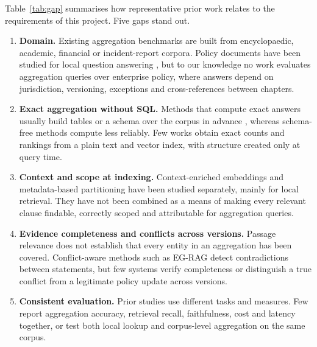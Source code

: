 \documentclass[11pt,letterpaper,oneside]{report}
\begin{document}
Table~\ref{tab:gap} summarises how representative prior work relates to the
requirements of this project. Five gaps stand out.

\begin{enumerate}
  \item \textbf{Domain.} Existing aggregation benchmarks are built from
  encyclopaedic, academic, financial or incident-report corpora. Policy
  documents have been studied for local question answering
  \citep{maharjan2026chunking}, but to our knowledge no work evaluates
  aggregation queries over enterprise policy, where answers depend on
  jurisdiction, versioning, exceptions and cross-references between chapters.
  \item \textbf{Exact aggregation without SQL.} Methods that compute exact
  answers usually build tables or a schema over the corpus in advance
  \citep{koshorek2025srag,lu2026corpusqa,patel2025lotus}, whereas schema-free
  methods compute less reliably. Few works obtain exact counts and rankings
  from a plain text and vector index, with structure created only at query
  time.
  \item \textbf{Context and scope at indexing.} Context-enriched embeddings
  \citep{gunther2024latechunking} and metadata-based partitioning
  \citep{maio2026olap,subedi2026dilution} have been studied separately,
  mainly for local retrieval. They have not been combined as a means of
  making every relevant clause findable, correctly scoped and attributable
  for aggregation queries.
  \item \textbf{Evidence completeness and conflicts across versions.}
  Passage relevance does not establish that every entity in an aggregation
  has been covered. Conflict-aware methods such as EG-RAG
  \citep{hong2026egrag} detect contradictions between statements, but few
  systems verify completeness or distinguish a true conflict from a
  legitimate policy update across versions.
  \item \textbf{Consistent evaluation.} Prior studies use different tasks
  and measures. Few report aggregation accuracy, retrieval recall,
  faithfulness, cost and latency together, or test both local lookup and
  corpus-level aggregation on the same corpus.
\end{enumerate}
\end{document}
